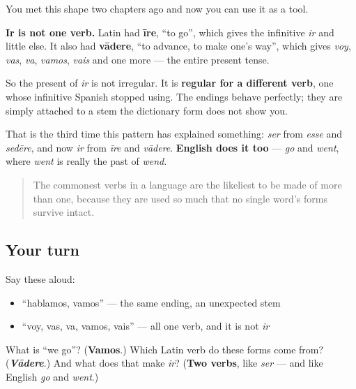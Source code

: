 \begin{cousinweb}
You met this shape two chapters ago and now you can use it as a tool.

\textbf{Ir is not one verb.} Latin had \textbf{īre}, \textquotedblleft{}to go\textquotedblright{}, which gives the infinitive \emph{ir} and little else. It also had \textbf{vādere}, \textquotedblleft{}to advance, to make one's way\textquotedblright{}, which gives \emph{voy}, \emph{vas}, \emph{va}, \emph{vamos}, \emph{vais} and one more — the entire present tense.

So the present of \emph{ir} is not irregular. It is \textbf{regular for a different verb}, one whose infinitive Spanish stopped using. The endings behave perfectly; they are simply attached to a stem the dictionary form does not show you.

That is the third time this pattern has explained something: \emph{ser} from \emph{esse} and \emph{sedēre}, and now \emph{ir} from \emph{īre} and \emph{vādere}. \textbf{English does it too} — \emph{go} and \emph{went}, where \emph{went} is really the past of \emph{wend}.

\begin{quote}
The commonest verbs in a language are the likeliest to be made of more than one, because they are used so much that no single word's forms survive intact.
\end{quote}
\end{cousinweb}

\subsection*{Your turn}
Say these aloud:

\begin{itemize}
\raggedright
  \item \textquotedblleft{}hablamos, vamos\textquotedblright{} — the same ending, an unexpected stem
  \item \textquotedblleft{}voy, vas, va, vamos, vais\textquotedblright{} — all one verb, and it is not \emph{ir}
\end{itemize}

\begin{tcolorbox}[breakable,colback=teal!4,colframe=teal!35!black,title={Before you move on}]
What is \textquotedblleft{}we go\textquotedblright{}? (\textbf{Vamos}.) Which Latin verb do these forms come from? (\emph{\textbf{Vādere}}.) And what does that make \emph{ir}? (\textbf{Two verbs}, like \emph{ser} — and like English \emph{go} and \emph{went}.)
\end{tcolorbox}
